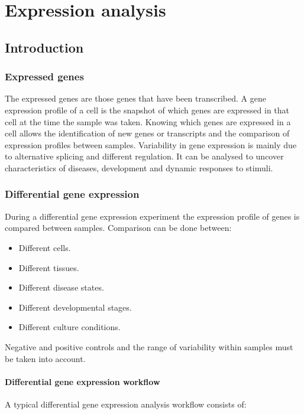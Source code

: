 \chapter{Expression analysis}

\section{Introduction}

	\subsection{Expressed genes}
	The expressed genes are those genes that have been transcribed.
	A gene expression profile of a cell is the snapshot of which genes are expressed in that cell at the time the sample was taken.
	Knowing which genes are expressed in a cell allows the identification of new genes or transcripts and the comparison of expression profiles between samples.
	Variability in gene expression is mainly due to alternative splicing and different regulation.
	It can be analysed to uncover characteristics of diseases, development and dynamic responses to stimuli.

	\subsection{Differential gene expression}
	During a differential gene expression experiment the expression profile of genes is compared between samples.
	Comparison can be done between:

	\begin{multicols}{2}
		\begin{itemize}
			\item Different cells.
			\item Different tissues.
			\item Different disease states.
			\item Different developmental stages.
			\item Different culture conditions.
		\end{itemize}
	\end{multicols}

	Negative and positive controls and the range of variability within samples must be taken into account.

		\subsubsection{Differential gene expression workflow}
		A typical differential gene expression analysis workflow consists of:

